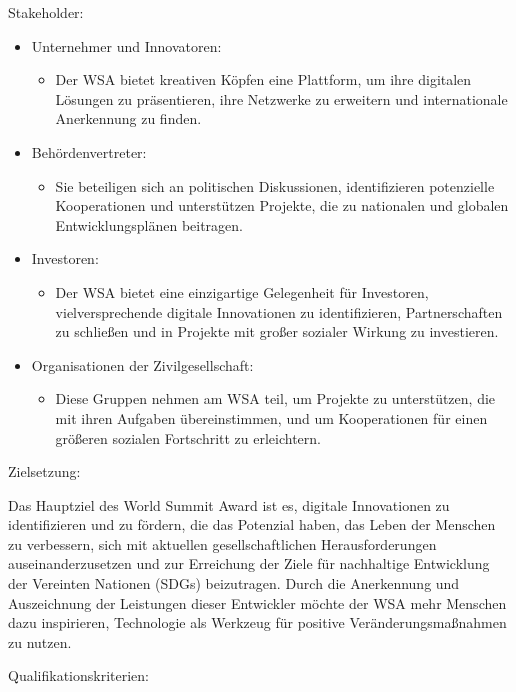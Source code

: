 Stakeholder:

\begin{itemize}
    \item {Unternehmer und Innovatoren:}
    \begin{itemize}
        \item {Der WSA bietet kreativen Köpfen eine Plattform, um ihre digitalen Lösungen zu präsentieren, ihre Netzwerke zu erweitern und internationale Anerkennung zu finden.}
    \end{itemize}
    \item {Behördenvertreter:}
    \begin{itemize}
        \item {Sie beteiligen sich an politischen Diskussionen, identifizieren potenzielle Kooperationen und unterstützen Projekte, die zu nationalen und globalen Entwicklungsplänen beitragen.}
    \end{itemize}
    \item {Investoren:}
    \begin{itemize}
        \item {Der WSA bietet eine einzigartige Gelegenheit für Investoren, vielversprechende digitale Innovationen zu identifizieren, Partnerschaften zu schließen und in Projekte mit großer sozialer Wirkung zu investieren.}
    \end{itemize}
    \item {Organisationen der Zivilgesellschaft:}
    \begin{itemize}
        \item {Diese Gruppen nehmen am WSA teil, um Projekte zu unterstützen, die mit ihren Aufgaben übereinstimmen, und um Kooperationen für einen größeren sozialen Fortschritt zu erleichtern.}
    \end{itemize}
\end{itemize}

Zielsetzung:

Das Hauptziel des World Summit Award ist es, digitale Innovationen zu identifizieren und zu fördern, die das Potenzial haben, das Leben der Menschen zu verbessern, sich mit aktuellen gesellschaftlichen Herausforderungen auseinanderzusetzen und zur Erreichung der Ziele für nachhaltige Entwicklung der Vereinten Nationen (SDGs) beizutragen. Durch die Anerkennung und Auszeichnung der Leistungen dieser Entwickler möchte der WSA mehr Menschen dazu inspirieren, Technologie als Werkzeug für positive Veränderungsmaßnahmen zu nutzen.

Qualifikationskriterien:

